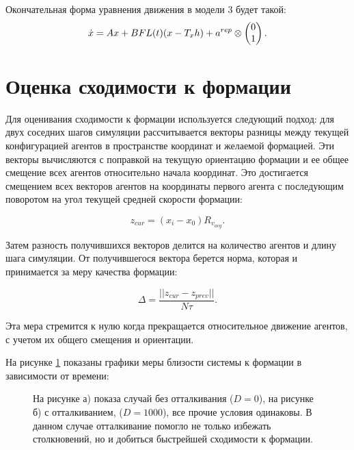 Окончательная форма уравнения движения в модели 3 будет такой:
\begin{equation}
\dot{x}=Ax+BFL(t)(x-T_x h)+a^{rep}\otimes \veccol{0;1}.
\end{equation}

\section{Оценка сходимости к формации}

Для оценивания сходимости к формации используется следующий подход:
для двух соседних шагов симуляции рассчитывается векторы разницы между текущей конфигурацией агентов в пространстве координат и желаемой формацией. Эти векторы вычисляются с поправкой на текущую ориентацию формации и ее общее смещение всех агентов относительно начала координат. Это достигается смещением всех векторов агентов на координаты первого агента с последующим поворотом на угол текущей средней скорости формации:

\begin{equation}
z_{cur}=(x_i-x_0)R_{v_{avg}}.
\end{equation}

Затем разность получившихся векторов делится на количество агентов и длину шага симуляции. От получившегося вектора берется норма, которая и принимается за меру качества формации:

\begin{equation}
\Delta=\frac{||z_{cur}-z_{prev}||}{N\tau}.
\end{equation}

Эта мера стремится к нулю когда прекращается относительное движение агентов, с учетом их общего смещения и ориентации.

На рисунке \ref{fig:formation-error} показаны графики меры близости системы к формации в зависимости от времени:

\begin{figure}[h]
  \begin{minipage}[h]{0.45\linewidth}
  \end{minipage}
  \hfill
  \begin{minipage}[h]{0.45\linewidth}
  \end{minipage}
  \caption{На рисунке а) показа случай без отталкивания ($D=0$), на рисунке б) с отталкиванием, ($D=1000$), все прочие условия одинаковы. В данном случае отталкивание помогло не только избежать столкновений, но и добиться быстрейшей сходимости к формации.}
\label{fig:formation-error}
\end{figure}


\clearpage
